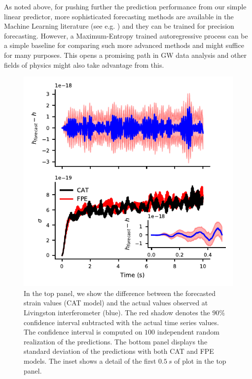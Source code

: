 \documentclass[twocolumn,showpacs,preprintnumbers,nofootinbib,prd,
superscriptaddress,10pt]{revtex4-1}
\begin{document}
As noted above, for pushing further the prediction performance from our simple linear predictor, more sophisticated forecasting methods are available in the Machine Learning literature (see e.g. \cite{LSTM_article, oord2016wavenet}) and they can be trained for precision forecasting. However, a Maximum-Entropy trained autoregressive process can be a simple baseline for comparing such more advanced methods and might suffice for many purposes.
This opens a promising path in GW data analysis and other fields of physics might also take advantage from this.

\begin{figure}
	\caption{In the top panel, we show the difference between the forecasted strain values (CAT model) and the actual values observed at Livingston interferometer (blue). The red shadow denotes the $90\%$ confidence interval subtracted with the actual time series values. The confidence interval is computed on  $100$ independent random realization of the predictions.
	The bottom panel displays the standard deviation of the predictions with both CAT and FPE models. The inset shows a detail of the first $\SI{0.5}{s}$ of plot in the top panel.
	}
	\label{fig:LIGO_forecast}
	\includegraphics{Images/forecast_LIGO/forecast_accuracy.pdf}
\end{figure}
\end{document}
